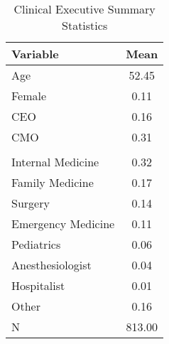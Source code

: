 \begin{table}[ht!]
\centering
\caption{\label{doc_sumstats}Clinical Executive Summary Statistics}
\centering
\begin{tabular}[t]{lc}
\toprule
Variable & Mean\\
\midrule
Age & 52.45\\
Female & 0.11\\
CEO & 0.16\\
CMO & 0.31\\
\addlinespace[0.3em]
\multicolumn{2}{l}{\textbf{Specialty}}\\
\hspace{1em}Internal Medicine & 0.32\\
\hspace{1em}Family Medicine & 0.17\\
\hspace{1em}Surgery & 0.14\\
\hspace{1em}Emergency Medicine & 0.11\\
\hspace{1em}Pediatrics & 0.06\\
\hspace{1em}Anesthesiologist & 0.04\\
\hspace{1em}Hospitalist & 0.01\\
\hspace{1em}Other & 0.16\\
N & 813.00\\
\bottomrule
\end{tabular}
\end{table}
